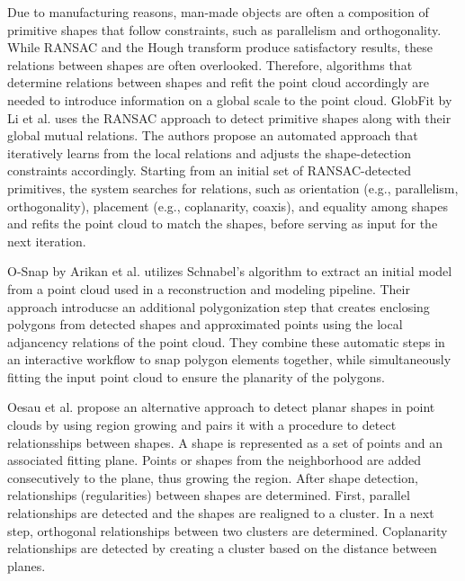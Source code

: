 Due to manufacturing reasons, man-made objects are often a composition of primitive shapes that follow constraints, such as parallelism and orthogonality. 
While RANSAC and the Hough transform produce satisfactory results, these relations between shapes are often overlooked. Therefore, algorithms that determine relations between shapes and refit the point cloud accordingly are needed to introduce information on a global scale to the point cloud. 
GlobFit by Li et al. \cite{li2011globfit} uses the RANSAC approach to detect primitive shapes along with their global mutual relations. The authors propose an automated approach that iteratively learns from the local relations and adjusts the shape-detection constraints accordingly. Starting from an initial set of RANSAC-detected primitives, the system searches for relations, such as orientation (e.g., parallelism, orthogonality), placement (e.g., coplanarity, coaxis), and equality among shapes and refits the point cloud to match the shapes, before serving as input for the next iteration. 

\par

O-Snap by Arikan et al. \cite{arikan-2013-osn} utilizes Schnabel's algorithm to extract an initial model from a point cloud used in a reconstruction and modeling pipeline. Their approach introducse an additional polygonization step that creates enclosing polygons from detected shapes and approximated points using the local adjancency relations of the point cloud. They combine these automatic steps in an interactive workflow to snap polygon elements together, while simultaneously fitting the input point cloud to ensure the planarity of the polygons. 

\par

Oesau et al. \cite{oesau2016planar} propose an alternative approach to detect planar shapes in point clouds by using region growing and pairs it with a procedure to detect relationsships between shapes. A shape is represented as a set of points and an associated fitting plane. Points or shapes from the neighborhood are added consecutively to the plane, thus growing the region. After shape detection, relationships (regularities) between shapes are determined. First, parallel relationships are detected and the shapes are realigned to a cluster. In a next step, orthogonal relationships between two clusters are determined. Coplanarity relationships are detected by creating a cluster based on the distance between planes. 
